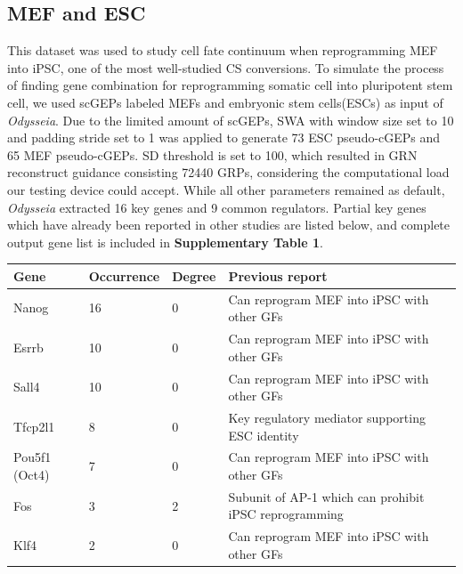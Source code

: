 \documentclass[fleqn,10pt]{wlscirep}
\begin{document}
\subsection*{MEF and ESC}
This dataset was used to study cell fate continuum when reprogramming MEF into iPSC, one of the most well-studied CS conversions.\cite{mef_ipsc_cas}
To simulate the process of finding gene combination for reprogramming somatic cell into pluripotent stem cell, we used scGEPs labeled MEFs and embryonic stem cells(ESCs) as input of \emph{Odysseia}.
Due to the limited amount of scGEPs, SWA with window size set to 10 and padding stride set to 1 was applied to generate 73 ESC pseudo-cGEPs and 65 MEF pseudo-cGEPs.
SD threshold is set to 100, which resulted in GRN reconstruct guidance consisting 72440 GRPs, considering the computational load our testing device could accept.
While all other parameters remained as default, \emph{Odysseia} extracted 16 key genes and 9 common regulators.
Partial key genes which have already been reported in other studies are listed below, and complete output gene list is included in \textbf{Supplementary Table 1}.

\begin{table}[ht]
\centering
\begin{tabular}{|l|l|l|l|}
\hline
\textbf{Gene} & \textbf{Occurrence} & \textbf{Degree} & \textbf{Previous report}  \\
\hline
Nanog & 16 & 0 & Can reprogram MEF into iPSC with other GFs\cite{ips7f, oct4_nanog_sox2_lin28, oct4_nanog_sox2} \\
\hline
Esrrb & 10 & 0 & Can reprogram MEF into iPSC with other GFs\cite{ips7f, LIF_esrrb, gtmEsrrb_iPSC, JARID2_PRDM14_ESRRB_SALL4A} \\
\hline
Sall4 & 10 & 0 & Can reprogram MEF into iPSC with other GFs\cite{ips7f, JARID2_PRDM14_ESRRB_SALL4A} \\
\hline
Tfcp2l1 & 8 & 0 & Key regulatory mediator supporting ESC identity\cite{tfcp2l1_1, tfcp2l1_2} \\
\hline
Pou5f1 (Oct4) & 7 & 0 & Can reprogram MEF into iPSC with other GFs\cite{yamanaka_2006, oct4_nanog_sox2_lin28, oct4_nanog_sox2, ips2f, ipsOK, osk} \\
\hline
Fos & 3 & 2 & Subunit of AP-1 which can prohibit iPSC reprogramming\cite{ips7f, ipsAP1} \\
\hline
Klf4 & 2 & 0 & Can reprogram MEF into iPSC with other GFs\cite{yamanaka_2006, ips2f, ipsOK, osk} \\
\hline
\end{tabular}
\end{table}
\end{document}

